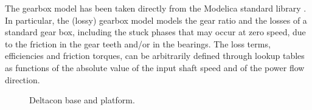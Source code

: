 \documentclass[]{interact}
\theoremstyle{plain}%
\theoremstyle{definition}
\theoremstyle{remark}
\begin{document}
The gearbox model has been taken directly from the Modelica standard library \cite{PSO20002}. In particular, the (lossy) gearbox model models the gear ratio and the losses of a standard gear box, including the stuck phases that may occur at zero speed, due to the friction in the gear teeth and/or in the bearings. The loss terms, efficiencies and friction torques, can be arbitrarily defined through lookup tables as functions of the absolute value of the input shaft speed and of the power flow direction.

\begin{figure}
\centering
{}\hspace{1cm}
\caption{Deltacon base and platform.} \label{Fig:Deltacon_kinematics_parameters}
\end{figure}
\end{document}
